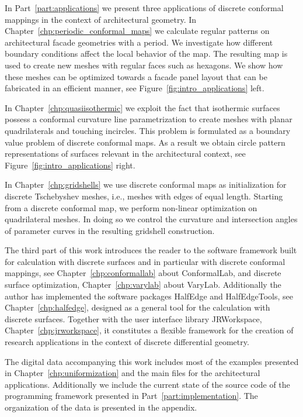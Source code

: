 \documentclass[Thesis.tex]{subfiles}
\begin{document}
In Part~\ref{part:applications} we present three applications of discrete conformal mappings in the context of architectural geometry. 
In Chapter~\ref{chp:periodic_conformal_maps} we calculate regular patterns on architectural facade geometries with a period. 
We investigate how different boundary conditions affect the local behavior of the map.
The resulting map is used to create new meshes with regular faces such as hexagons.
We show how these meshes can be optimized towards a facade panel layout that can be fabricated in an efficient manner, see Figure~\ref{fig:intro_applications} left.

In Chapter~\ref{chp:quasiisothermic} we exploit the fact that isothermic surfaces possess a conformal curvature line parametrization to create meshes with planar quadrilaterals and touching incircles. 
This problem is formulated as a boundary value problem of discrete conformal maps.
As a result we obtain circle pattern representations of surfaces relevant in the architectural context, see Figure~\ref{fig:intro_applications} right.

In Chapter~\ref{chp:gridshells} we use discrete conformal maps as initialization for discrete Tschebyshev meshes, i.e., meshes with  edges of equal length. 
Starting from a discrete conformal map, we perform non-linear optimization on quadrilateral meshes.
In doing so we control the curvature and intersection angles of parameter curves in the resulting gridshell construction.

The third part of this work introduces the reader to the software framework built for calculation with discrete surfaces and in particular with discrete conformal mappings, see Chapter~\ref{chp:conformallab}  about {\sc ConformalLab}, and discrete surface optimization, Chapter~\ref{chp:varylab} about {\sc VaryLab}. 
Additionally the author has implemented the software packages {\sc HalfEdge} and {\sc HalfEdgeTools}, see Chapter~\ref{chp:halfedge}, designed as a general tool for the calculation with discrete surfaces. 
Together with the user interface library {\sc JRWorkspace}, Chapter~\ref{chp:jrworkspace}, it constitutes a flexible framework for the creation of research applications in the context of discrete differential geometry. 

The digital data accompanying this work includes most of the examples presented in Chapter~\ref{chp:uniformization} and the main files for the architectural applications. 
Additionally we include the current state of the source code of the programming framework presented in Part~\ref{part:implementation}. 
The organization of the data is presented in the appendix.
\end{document}
